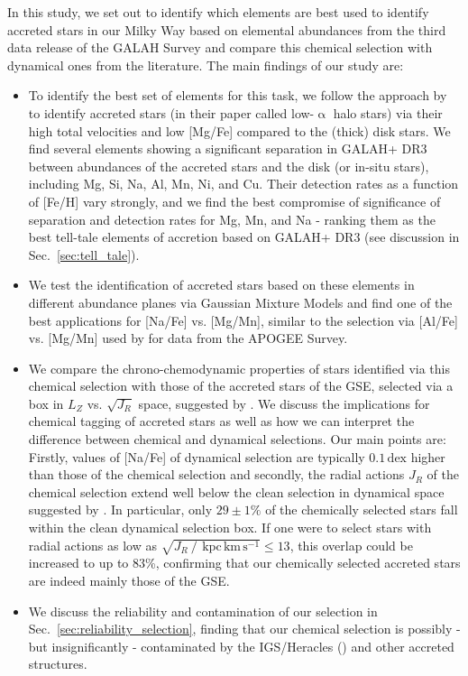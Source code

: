 \documentclass[fleqn,usenatbib]{mnras}
\newcommand{\dex}{\,\mathrm{dex}}	%
\newcommand{\kpckms}{\,\mathrm{kpc\,km\,s^{-1}}}	%
\begin{document}
In this study, we set out to identify which elements are best used to identify accreted stars in our Milky Way based on elemental abundances from the third data release of the GALAH Survey \citep{Buder2021} and compare this chemical selection with dynamical ones from the literature. The main findings of our study are:
\begin{itemize}
\item To identify the best set of elements for this task, we follow the approach by \citet{Nissen2010} to identify accreted stars (in their paper called low-$\upalpha$ halo stars) via their high total velocities and low [Mg/Fe] compared to the (thick) disk stars. We find several elements showing a significant separation in GALAH+ DR3 between abundances of the accreted stars and the disk (or in-situ stars), including Mg, Si, Na, Al, Mn, Ni, and Cu. Their detection rates as a function of [Fe/H] vary strongly, and we find the best compromise of significance of separation and detection rates for Mg, Mn, and Na - ranking them as the best tell-tale elements of accretion based on GALAH+ DR3 (see discussion in Sec.~\ref{sec:tell_tale}).
\item We test the identification of accreted stars based on these elements in different abundance planes via Gaussian Mixture Models and find one of the best applications for [Na/Fe] vs. [Mg/Mn], similar to the selection via [Al/Fe] vs. [Mg/Mn] used by \citet{Das2020} for data from the APOGEE Survey. 
\item We compare the chrono-chemodynamic properties of stars identified via this chemical selection with those of the accreted stars of the GSE, selected via a box in $L_Z$ vs. $\sqrt{J_R}$ space, suggested by \citet{Feuillet2021}. We discuss the implications for chemical tagging of accreted stars as well as how we can interpret the difference between chemical and dynamical selections. Our main points are: Firstly, values of [Na/Fe] of dynamical selection are typically $0.1\dex$ higher than those of the chemical selection and secondly, the radial actions $J_R$ of the chemical selection extend well below the clean selection in dynamical space suggested by \citet{Feuillet2021}. In particular, only $29\pm1\%$ of the chemically selected stars fall within the clean dynamical selection box. If one were to select stars with radial actions as low as $\sqrt{J_R~/~\kpckms} \leq 13$, this overlap could be increased to up to 83\%, confirming that our chemically selected accreted stars are indeed mainly those of the GSE.
\item We discuss the reliability and contamination of our selection in Sec.~\ref{sec:reliability_selection}, finding that our chemical selection is possibly - but insignificantly - contaminated by the IGS/Heracles () and other accreted structures.

\end{itemize}
\end{document}
